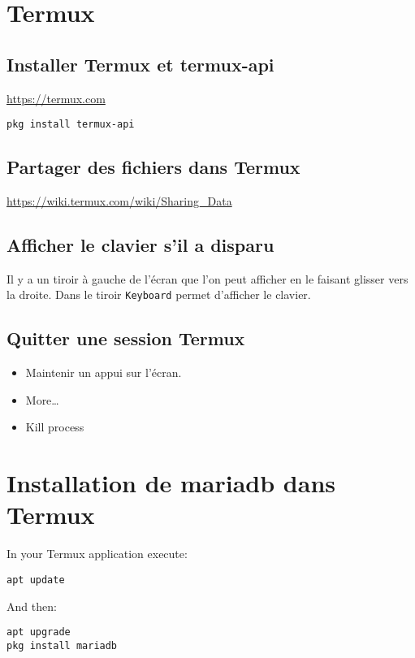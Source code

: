 \documentclass[11pt]{article}
\author{unknown}
\date{\today}
\title{}
\begin{document}
\tableofcontents

\section{Termux}
\label{sec:orgce5d974}
\subsection{Installer Termux et termux-api}
\label{sec:org2ca575c}

\url{https://termux.com}

\begin{verbatim}
pkg install termux-api
\end{verbatim}
\subsection{Partager des fichiers dans Termux}
\label{sec:org9eb08d4}
\url{https://wiki.termux.com/wiki/Sharing\_Data}


\subsection{Afficher le clavier s'il a disparu}
\label{sec:orgfcc37b0}
Il y a un tiroir à gauche de l'écran que l'on peut afficher en le faisant glisser vers la droite.
Dans le tiroir \texttt{Keyboard} permet d'afficher le clavier.
\subsection{Quitter une session Termux}
\label{sec:orgf30571c}
\begin{itemize}
\item Maintenir un appui sur l'écran.
\item More\ldots{}
\item Kill process
\end{itemize}

\section{Installation de mariadb dans Termux}
\label{sec:org213ba88}
In your Termux application execute:

\begin{verbatim}
apt update
\end{verbatim}

And then:

\begin{verbatim}
apt upgrade
pkg install mariadb
\end{verbatim}
\end{document}
